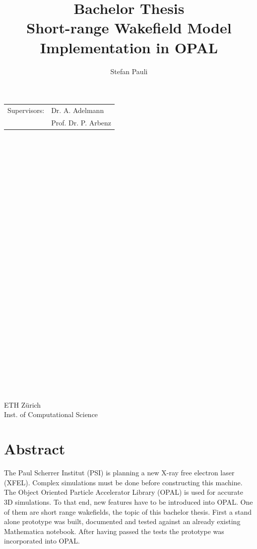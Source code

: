 \documentclass[11pt,a4paper]{article}
\author{Stefan Pauli}
\title{Bachelor Thesis\\ 
Short-range Wakefield Model Implementation in OPAL}
\newcommand{\opal}{\textsc{OPAL}}
\begin{document}
\maketitle
\begin{center}
\begin{tabular}{ l l }
\large Supervisors: & Dr. A. Adelmann \\
  & Prof. Dr. P. Arbenz\\
\end{tabular}
\end{center}
\mbox{}\\ \mbox{}\\ \mbox{}\\ \mbox{}\\ \mbox{}\\ \mbox{}\\ \mbox{}\\ \mbox{}\\ \mbox{}\\ \mbox{}\\ \mbox{}\\ \mbox{}\\ \mbox{}\\ \mbox{}\\ \mbox{}\\ \mbox{}\\ \mbox{}\\ \mbox{}\\ \mbox{}\\ \mbox{}\\ \mbox{}\\ \mbox{}\\ \mbox{}\\ \mbox{}\\ \mbox{}\\ \mbox{}\\ \mbox{}\\ 
ETH Zürich\\
Inst. of Computational Science
\thispagestyle{empty}
\newpage

\section*{Abstract}

The Paul Scherrer Institut (PSI) is planning a new X-ray free electron
laser (XFEL).  Complex simulations must be done before constructing this
machine.  The Object Oriented Particle Accelerator Library (\opal) is
used for accurate 3D simulations.  To that end, new features have to be
introduced into OPAL.  One of them are short range wakefields, the topic
of this bachelor thesis.  First a stand alone prototype was built,
documented and tested against an already existing Mathematica notebook.
After having passed the tests the prototype was incorporated into OPAL.
\thispagestyle{empty}
\newpage
\end{document}
